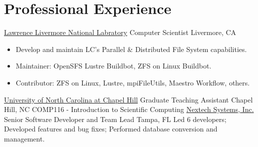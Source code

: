 \section{Professional Experience}
		{\href{http://www.llnl.gov}{Lawrence Livermore National Labratory}}
		{Computer Scientist}
		{Livermore, CA}{}
		{\begin{itemize}
		\item Develop and maintain LC's Parallel \& Distributed File System capabilities.
		\item Maintainer: OpenSFS Lustre Buildbot, ZFS on Linux Buildbot.
		\item Contributor: ZFS on Linux, Lustre, mpiFileUtils, Maestro Workflow, others.
		\end{itemize}}
		{\href{http://www.unc.edu}{University of North Carolina at Chapel Hill}}
		{Graduate Teaching Assistant}
		{Chapel Hill, NC}{}
		{COMP116 - Introduction to Scientific Computing}
		{\href{http://www.nextech.com}{Nextech Systems, Inc.}}
		{Senior Software Developer and Team Lead}
		{Tampa, FL}{}
		{Led 6 developers; Developed features and
		bug fixes; Performed database conversion and management.}


